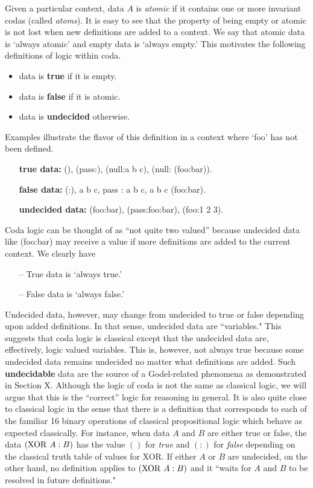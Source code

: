 \documentclass[11pt]{article}
\begin{document}
     Given a particular context, data $A$ is {\it atomic} if it contains 
one or more invariant codas (called {\it atoms}).   It is easy to see that the property of being empty or atomic is not lost when  
new definitions are added to a context.  We say that atomic data is `always atomic' and empty data is `always empty.'
This motivates the following definitions of logic within coda.
\begin{itemize}
\item data is {\bf true} if it is empty.
\item data is {\bf false} if it is atomic. 
\item data is {\bf undecided} otherwise. 
\end{itemize}
Examples illustrate the flavor of this definition in a context where `foo' has not been defined.  
\begin{itemize}
\item[] {\bf true data:} (), (pass:), (null:a b c), (null: (foo:bar)).
\item[] {\bf false data:} (:), a b c, pass : a b c, a b c (foo:bar).
\item[] {\bf undecided data:}  (foo:bar), (pass:foo:bar), (foo:1 2 3).
\end{itemize}
Coda logic can be thought of as ``not quite two valued'' because undecided data like (foo:bar) may receive a value if more definitions are added to the current context.
We clearly have
\begin{itemize}
\item[--] True data is `always true.'
\item[--] False data is `always false.'
\end{itemize}
Undecided data, however, may change from undecided to true or false depending upon added definitions.  In that sense, undecided data are ``variables."   
This suggests that coda logic is classical except that 
the undecided data are, effectively, logic valued variables.  This is, however, not always true because some undecided data remains 
undecided no matter what definitions are added.  Such {\bf undecidable} 
data are the source of a Godel-related phenomena as demonstrated in Section X.  
Although the logic of coda is not the same as classical logic, we will argue that this is the ``correct'' logic for reasoning in general.  
It is also quite close to classical logic in the 
sense that there is a definition that corresponds to each of the familiar 16 binary operations of classical propositional logic which behave as expected classically.  For instance, when data $A$ and $B$ are either true or false, 
the data $({\rm XOR}\ A:B)$ has the value $()$ for {\it true} and $(:)$ for {\it false} depending on the classical truth table of values for XOR.  If either $A$ or $B$ are undecided, on the other hand, 
no definition applies to $({\rm XOR}\ A:B)$ and it ``waits for $A$ and $B$ to be resolved in future definitions."
    
\end{document}
